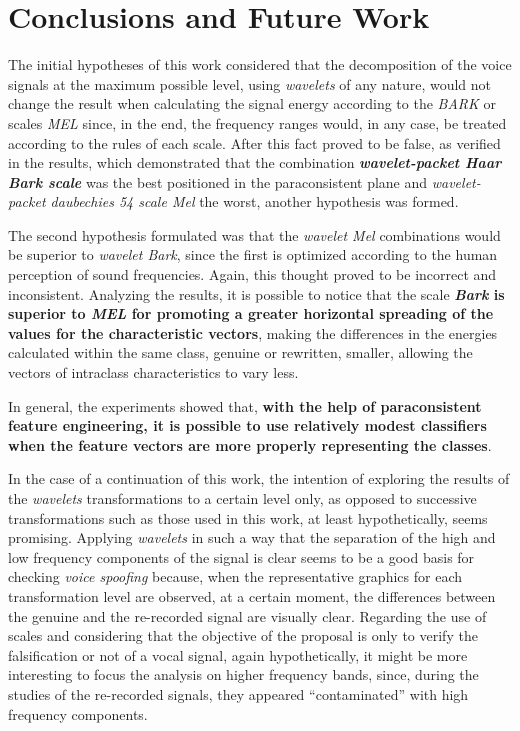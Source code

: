 \section{Conclusions and Future Work}
\label{chap:conclusions}

\par The initial hypotheses of this work considered that the decomposition of the voice signals at the maximum possible level, using \textit{wavelets} of any nature, would not change the result when calculating the signal energy according to the \textit{BARK} or scales \textit{MEL} since, in the end, the frequency ranges would, in any case, be treated according to the rules of each scale. After this fact proved to be false, as verified in the results, which demonstrated that the combination \textbf{\textit{wavelet-packet Haar Bark scale}} was the best positioned in the paraconsistent plane and \textit{wavelet-packet daubechies 54 scale Mel} the worst, another hypothesis was formed.

\par The second hypothesis formulated was that the \textit{wavelet Mel} combinations would be superior to \textit{wavelet Bark}, since the first is optimized according to the human perception of sound frequencies. Again, this thought proved to be incorrect and inconsistent. Analyzing the results, it is possible to notice that the scale \textbf{\textit{Bark} is superior to \textit{MEL} for promoting a greater horizontal spreading of the values for the characteristic vectors}, making the differences in the energies calculated within the same class, genuine or rewritten, smaller, allowing the vectors of intraclass characteristics to vary less.

\par In general, the experiments showed that, \textbf{with the help of paraconsistent feature engineering, it is possible to use relatively modest classifiers when the feature vectors are more properly representing the classes}.

\par In the case of a continuation of this work, the intention of exploring the results of the \textit{wavelets} transformations to a certain level only, as opposed to successive transformations such as those used in this work, at least hypothetically, seems promising. Applying \textit{wavelets} in such a way that the separation of the high and low frequency components of the signal is clear seems to be a good basis for checking \textit{voice spoofing} because, when the representative graphics for each transformation level are observed, at a certain moment, the differences between the genuine and the re-recorded signal are visually clear. Regarding the use of scales and considering that the objective of the proposal is only to verify the falsification or not of a vocal signal, again hypothetically, it might be more interesting to focus the analysis on higher frequency bands, since, during the studies of the re-recorded signals, they appeared ``contaminated'' with high frequency components.
